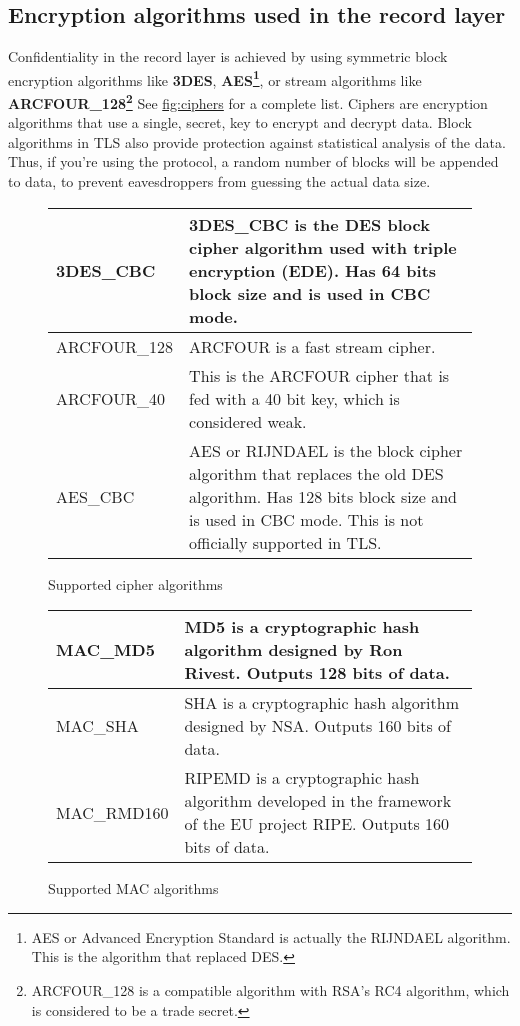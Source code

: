 \subsection*{Encryption algorithms used in the record layer}
Confidentiality in the record layer is achieved by using symmetric block 
encryption algorithms like {\bf 3DES}, {\bf AES\footnote{AES or Advanced 
Encryption Standard is actually the RIJNDAEL algorithm. This is the
algorithm that replaced DES.}}, or
stream algorithms like {\bf ARCFOUR\_128\footnote{ARCFOUR\_128 is a compatible
algorithm with RSA's RC4 algorithm, which is considered to be a trade secret.}} See \hyperref{fig:ciphers}{figure }{}{fig:ciphers} for a complete list. 
Ciphers are encryption algorithms that use a single, secret, key
to encrypt and decrypt data. Block algorithms in TLS also provide protection
against statistical analysis of the data. 
Thus, if you're using the \tlsI{} protocol, a random number of blocks will be
appended to data, to prevent eavesdroppers from guessing the 
actual data size.

\begin{figure}[hbtp]
\begin{tabular}{|l|p{9cm}|}

\hline
3DES\_CBC & 3DES\_CBC is the DES block cipher algorithm used with triple
encryption (EDE). Has 64 bits block size and is used in CBC mode.
\\
\hline
ARCFOUR\_128 & ARCFOUR is a fast stream cipher.
\\
\hline
ARCFOUR\_40 & This is the ARCFOUR cipher that is fed with a 40 bit key,
which is considered weak.
\\
\hline
AES\_CBC & AES or RIJNDAEL is the block cipher algorithm that replaces 
the old DES algorithm. Has
128 bits block size and is used in CBC mode. This is not officially
supported in TLS.
\\
\hline
\end{tabular}
\caption{Supported cipher algorithms}
\label{fig:ciphers}
\end{figure}



\addvspace{1.5cm}

\begin{figure}[hbtp]
\begin{tabular}{|l|p{9cm}|}

\hline
MAC\_MD5 & MD5 is a cryptographic hash algorithm designed by Ron Rivest. Outputs 128 bits of data.
\\
\hline
MAC\_SHA & SHA is a cryptographic hash algorithm designed by NSA. Outputs 160 bits of data.
\\
\hline
MAC\_RMD160 & RIPEMD is a cryptographic hash algorithm developed in the framework
of the EU project RIPE. Outputs 160 bits of data.
\\
\hline
\end{tabular}
\caption{Supported MAC algorithms}
\label{fig:mac}
\end{figure}

